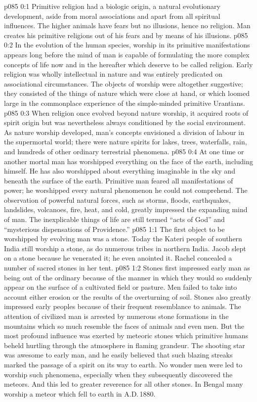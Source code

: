 \author{Brilliant Evening Star}
\vs p085 0:1 Primitive religion had a biologic origin, a natural evolutionary development, aside from moral associations and apart from all spiritual influences. The higher animals have fears but no illusions, hence no religion. Man creates his primitive religions out of his fears and by means of his illusions.
\vs p085 0:2 In the evolution of the human species, worship in its primitive manifestations appears long before the mind of man is capable of formulating the more complex concepts of life now and in the hereafter which deserve to be called religion. Early religion was wholly intellectual in nature and was entirely predicated on associational circumstances. The objects of worship were altogether suggestive; they consisted of the things of nature which were close at hand, or which loomed large in the commonplace experience of the simple\hyp{}minded primitive Urantians.
\vs p085 0:3 When religion once evolved beyond nature worship, it acquired roots of spirit origin but was nevertheless always conditioned by the social environment. As nature worship developed, man’s concepts envisioned a division of labour in the supermortal world; there were nature spirits for lakes, trees, waterfalls, rain, and hundreds of other ordinary terrestrial phenomena.
\vs p085 0:4 At one time or another mortal man has worshipped everything on the face of the earth, including himself. He has also worshipped about everything imaginable in the sky and beneath the surface of the earth. Primitive man feared all manifestations of power; he worshipped every natural phenomenon he could not comprehend. The observation of powerful natural forces, such as storms, floods, earthquakes, landslides, volcanoes, fire, heat, and cold, greatly impressed the expanding mind of man. The inexplicable things of life are still termed “acts of God” and “mysterious dispensations of Providence.”
\vs p085 1:1 The first object to be worshipped by evolving man was a stone. Today the Kateri people of southern India still worship a stone, as do numerous tribes in northern India. Jacob slept on a stone because he venerated it; he even anointed it. Rachel concealed a number of sacred stones in her tent.
\vs p085 1:2 Stones first impressed early man as being out of the ordinary because of the manner in which they would so suddenly appear on the surface of a cultivated field or pasture. Men failed to take into account either erosion or the results of the overturning of soil. Stones also greatly impressed early peoples because of their frequent resemblance to animals. The attention of civilized man is arrested by numerous stone formations in the mountains which so much resemble the faces of animals and even men. But the most profound influence was exerted by meteoric stones which primitive humans beheld hurtling through the atmosphere in flaming grandeur. The shooting star was awesome to early man, and he easily believed that such blazing streaks marked the passage of a spirit on its way to earth. No wonder men were led to worship such phenomena, especially when they subsequently discovered the meteors. And this led to greater reverence for all other stones. In Bengal many worship a meteor which fell to earth in A.D.\,1880.
